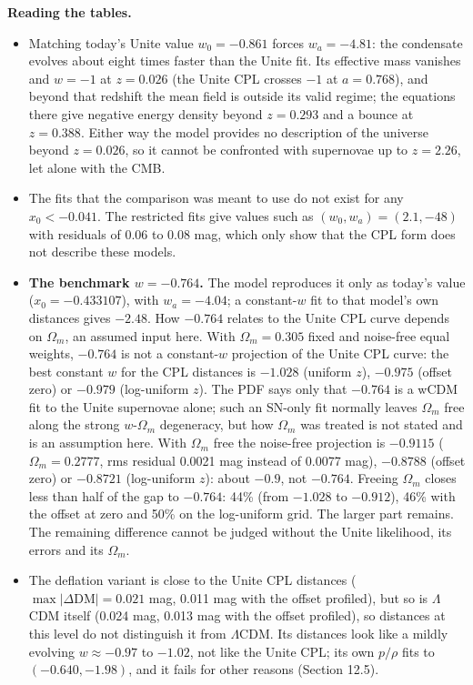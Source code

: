\documentclass[11pt]{article}
\begin{document}
\textbf{Reading the tables.}

\begin{itemize}
\item Matching today's Unite value $w_0=-0.861$ forces $w_a=-4.81$: the condensate evolves about eight times faster than the Unite fit. Its effective mass vanishes and $w=-1$ at $z=0.026$ (the Unite CPL crosses $-1$ at $a=0.768$), and beyond that redshift the mean field is outside its valid regime; the equations there give negative energy density beyond $z=0.293$ and a bounce at $z=0.388$. Either way the model provides no description of the universe beyond $z=0.026$, so it cannot be confronted with supernovae up to $z=2.26$, let alone with the CMB.
\item The fits that the comparison was meant to use do not exist for any $x_0<-0.041$. The restricted fits give values such as $(w_0,w_a)=(2.1,-48)$ with residuals of 0.06 to 0.08 mag, which only show that the CPL form does not describe these models.
\item \textbf{The benchmark $w=-0.764$.} The model reproduces it only as today's value ($x_0=-0.433107$), with $w_a=-4.04$; a constant-$w$ fit to that model's own distances gives $-2.48$. How $-0.764$ relates to the Unite CPL curve depends on $\Omega_m$, an assumed input here. With $\Omega_m=0.305$ fixed and noise-free equal weights, $-0.764$ is not a constant-$w$ projection of the Unite CPL curve: the best constant $w$ for the CPL distances is $-1.028$ (uniform $z$), $-0.975$ (offset zero) or $-0.979$ (log-uniform $z$). The PDF says only that $-0.764$ is a wCDM fit to the Unite supernovae alone; such an SN-only fit normally leaves $\Omega_m$ free along the strong $w$-$\Omega_m$ degeneracy, but how $\Omega_m$ was treated is not stated and is an assumption here. With $\Omega_m$ free the noise-free projection is $-0.9115$ ($\Omega_m=0.2777$, rms residual 0.0021 mag instead of 0.0077 mag), $-0.8788$ (offset zero) or $-0.8721$ (log-uniform $z$): about $-0.9$, not $-0.764$. Freeing $\Omega_m$ closes less than half of the gap to $-0.764$: 44\% (from $-1.028$ to $-0.912$), 46\% with the offset at zero and 50\% on the log-uniform grid. The larger part remains. The remaining difference cannot be judged without the Unite likelihood, its errors and its $\Omega_m$.
\item The deflation variant is close to the Unite CPL distances ($\max|\Delta\mathrm{DM}|=0.021$ mag, 0.011 mag with the offset profiled), but so is $\Lambda$CDM itself (0.024 mag, 0.013 mag with the offset profiled), so distances at this level do not distinguish it from $\Lambda$CDM. Its distances look like a mildly evolving $w\approx-0.97$ to $-1.02$, not like the Unite CPL; its own $p/\rho$ fits to $(-0.640,-1.98)$, and it fails for other reasons (Section 12.5).
\end{itemize}
\end{document}
